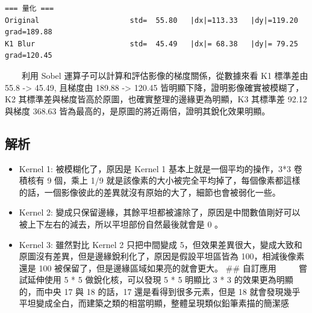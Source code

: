 \documentclass[11pt]{article}
\providecommand{\tightlist}{%
      \setlength{\itemsep}{0pt}\setlength{\parskip}{0pt}}
\begin{document}
    \begin{Verbatim}[commandchars=\\\{\}]
=== 量化 ===
Original                     std=  55.80   |dx|=113.33   |dy|=119.20
grad=189.88
K1 Blur                      std=  45.49   |dx|= 68.38   |dy|= 79.25
grad=120.45
    \end{Verbatim}

    \(\qquad\)利用 Sobel 運算子可以計算和評估影像的梯度關係，從數據來看 K1
標準差由 55.8 -\textgreater{} 45.49, 且梯度由 189.88 -\textgreater{}
120.45 皆明顯下降，證明影像確實被模糊了，K2
其標準差與梯度皆高於原圖，也確實整理的邊緣更為明顯，K3 其標準差 92.12
與梯度 368.63 皆為最高的，是原圖的將近兩倍，證明其銳化效果明顯。

    \subsection{解析}\label{ux89e3ux6790}

\begin{itemize}
\tightlist
\item
  Kernel 1: 被模糊化了，原因是 Kernel 1 基本上就是一個平均的操作，3*3
  卷積核有 9 個，乘上 1/9
  就是該像素的大小被完全平均掉了，每個像素都這樣的話，一個影像彼此的差異就沒有原始的大了，細節也會被弱化一些。
\item
  Kernel 2:
  變成只保留邊緣，其餘平坦都被濾除了，原因是中間數值剛好可以被上下左右的減去，所以平坦部份自然最後就會是
  0 。
\item
  Kernel 3: 雖然對比 Kernel 2 只把中間變成
  5，但效果差異很大，變成大致和原圖沒有差異，但是邊緣銳利化了，原因是假設平坦區皆為
  100，相減後像素還是 100 被保留了，但是邊緣區域如果亮的就會更大。 \#\#
  自訂應用 \(\qquad\) 嘗試延伸使用 5 * 5 做銳化核，可以發現 5 * 5 明顯比
  3 * 3 的效果更為明顯的，而中央 17 與 18 的話，17
  還是看得到很多元素，但是 18
  就會發現幾乎平坦變成全白，而建築之類的相當明顯，整體呈現類似鉛筆素描的簡潔感
\end{itemize}
\end{document}
